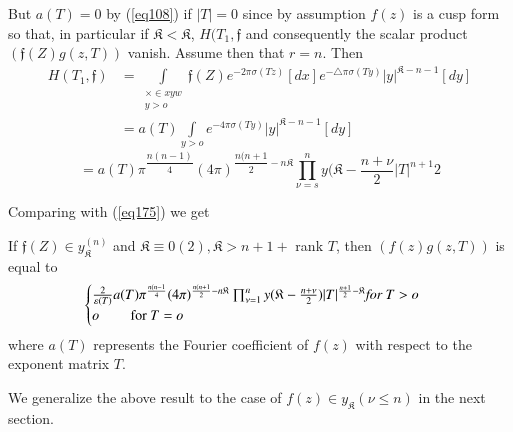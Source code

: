 But $a (T) = 0$ by (\ref{eq108}) if $| T | = 0$ since by assumption $f(z)$
is a cusp form so that, in particular if $\mathfrak{K} < \mathfrak{K}$,
$H(T_1, \mathfrak{f}$ and consequently the scalar product $(\mathfrak{f}
(Z) g (z, T))$ vanish. Assume then that $r = n$. Then  
\begin{align*}
H(T_1, \mathfrak{f}) & = \int\limits_{\substack{ \times \in xyw\\ y >
    o}} \mathfrak{f}(Z) e^{-2 \pi \sigma (T z)} [d x] e^{- \triangle
  \pi \sigma (T y)} | y |^{\mathfrak{K} - n -1} [d y]\\ 
& = a (T) \int\limits_{y > o} e^{- 4 \pi \sigma (T y)} | y
|^{\mathfrak{K} - n - 1} [d y] 
\end{align*}
\begin{equation*} 
= a(T) \pi ^{\dfrac{n (n - 1)}{4}} (4 \pi ) ^{\dfrac{n (n + 1}{2}- n
  \mathfrak{K}} \prod^n_{\nu = s} y (\mathfrak{K} - \frac{n +
  \nu}{2} | T |^{n + 1}{2} \tag{176}\label{eq176}   
\end{equation*}\pageoriginale 

Comparing with (\ref{eq175}) we get


\begin{thm}\label{chap10:thm11} %
 If $ \mathfrak{f} (Z) \in y_{\mathfrak{K}}^{(n)}$ and $\mathfrak{K}
 \equiv 0 (2), \mathfrak{K} > n + 1 + $ rank $T$, then $(f (z) g (z,
 T))$ is equal to 
 $$
\begin{cases}
\frac{2}{\varepsilon (T)} a(T) \pi^{\frac{n (n -1}{4}} (4
\pi)^{\frac{n (n + 1}{2} - n \mathfrak{K}} \prod_{\nu = 1}^{n}
y(\mathfrak{K} - \frac{n + \nu}{2} ) | T |^{\frac{n +1}{2}-
  \mathfrak{K}} \text {\em  for } T > o\\ 
o \qquad \text {  for  } T = o 
\end{cases}
$$
where $a(T)$ represents the Fourier coefficient of $f(z)$ with
  respect to the exponent matrix $T$. 
\end{thm}

We generalize the above result to the case of $f(z) \in
y_{\mathfrak{K}}   (\nu \le n)$ in the next section. 

